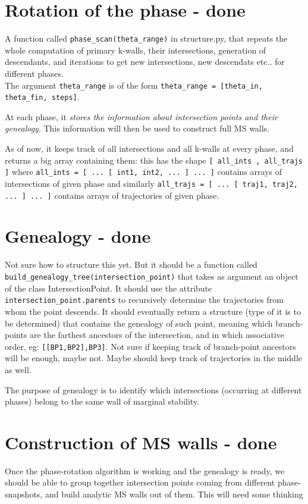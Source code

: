 \documentclass[11pt]{report}
\begin{document}
\section{Rotation of the phase - {\color{red} \bf done}}
A function called {\tt phase\_scan(theta\_range)} in structure.py, that repeats the whole computation of primary k-walls, their intersections, generation of descendants, and iterations to get new intersections, new descendats etc.. for different phases.\\
The argument {\tt theta\_range} is of the form {\tt theta\_range = [theta\_in, theta\_fin, steps]}.

At each phase, it \emph{stores the information about intersection points and their genealogy}. This information will then be used to construct full MS walls.

As of now, it keeps track of all intersections and all k-walls at every phase, and returns a big array containing them: this has the shape {\tt [  all\_ints , all\_trajs  ]} where {\tt all\_ints = [ ... [ int1, int2, ... ] ... ]} contains arrays of intersections of given phase and similarly {\tt all\_trajs = [ ... [ traj1, traj2, ... ] ... ]} contains arrays of trajectories of given phase.



\section{Genealogy - {\color{red} \bf done}}
Not sure how to structure this yet. But it should be a function called {\tt build\_genealogy\_tree(intersection\_point)} that takes as argument an object of the class IntersectionPoint.
It should use the attribute {\tt intersection\_point.parents} to recursively determine the trajectories from whom the point descends.
It should eventually return a structure (type of it is to be determined) that contains the genealogy of such point, meaning which branch-points are the farthest ancestors of the intersection, and in which associative order, eg: {\tt [[BP1,BP2],BP3]}.
Not sure if keeping track of branch-point ancestors will be enough, maybe not. Maybe should keep track of trajectories in the middle as well.

\medskip

The purpose of genealogy is to identify which intersections (occurring at different phases) belong to the same wall of marginal stability.


\section{Construction of MS walls  - {\color{red} \bf done}}
Once the phase-rotation algorithm is working and the genealogy is ready, we should be able to group together intersection points coming from different phase-snapshots, and build analytic MS walls out of them. This will need some thinking
\end{document}
